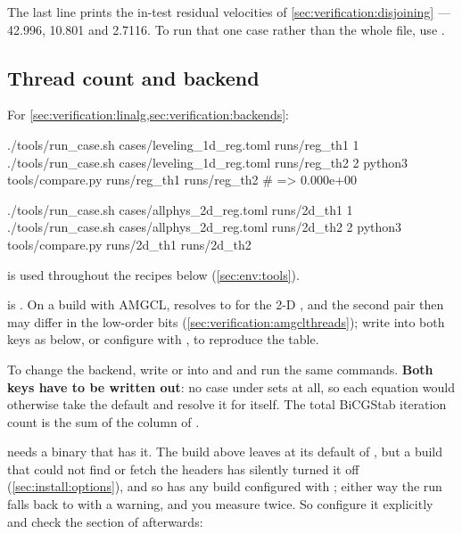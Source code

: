 The last line prints the in-test residual velocities of
\cref{sec:verification:disjoining} --- 42.996, 10.801 and 2.7116. To run that
one case rather than the whole file, use
.

\subsection{Thread count and backend}

For \cref{sec:verification:linalg,sec:verification:backends}:

\begin{shell}
./tools/run_case.sh cases/leveling_1d_reg.toml runs/reg_th1 1
./tools/run_case.sh cases/leveling_1d_reg.toml runs/reg_th2 2
python3 tools/compare.py runs/reg_th1 runs/reg_th2            # => 0.000e+00

./tools/run_case.sh cases/allphys_2d_reg.toml runs/2d_th1 1
./tools/run_case.sh cases/allphys_2d_reg.toml runs/2d_th2 2
python3 tools/compare.py runs/2d_th1 runs/2d_th2
\end{shell}

 is used throughout the recipes below
(\cref{sec:env:tools}).

 is . On a build with AMGCL, 
resolves to  for the 2-D , and the second
pair then may differ in the low-order bits
(\cref{sec:verification:amgclthreads}); write  into both
 keys as below, or configure with ,
to reproduce the table.

To change the backend, write  or 
into  and
 and run the same
commands. \textbf{Both keys have to be written out}: no case under
 sets  at all, so each equation would otherwise take
the  default and resolve it for itself. The
total BiCGStab iteration count is the sum of the  column of
.

 needs a binary that has it. The build above leaves
 at its default of , but a build that could
not find or fetch the headers has silently turned it off
(\cref{sec:install:options}), and so has any build configured with
; either way the run falls back to
 with a warning, and you measure  twice. So
configure it explicitly and check the  section of
 afterwards:

